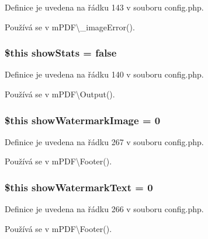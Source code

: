 Definice je uvedena na řádku 143 v souboru config.\-php.



Používá se v m\-P\-D\-F\textbackslash{}\-\_\-image\-Error().

\hypertarget{config_8php_ace8e8cc1120e006bd2107db6d57dc460}{
\subsubsection[{show\-Stats}]{\setlength{\rightskip}{0pt plus 5cm}\$this show\-Stats = {\bf false}}}\label{config_8php_ace8e8cc1120e006bd2107db6d57dc460}


Definice je uvedena na řádku 140 v souboru config.\-php.



Používá se v m\-P\-D\-F\textbackslash{}\-Output().

\hypertarget{config_8php_acf240bbb506618e1ed068b32d93d1a94}{
\subsubsection[{show\-Watermark\-Image}]{\setlength{\rightskip}{0pt plus 5cm}\$this show\-Watermark\-Image = 0}}\label{config_8php_acf240bbb506618e1ed068b32d93d1a94}


Definice je uvedena na řádku 267 v souboru config.\-php.



Používá se v m\-P\-D\-F\textbackslash{}\-Footer().

\hypertarget{config_8php_acd507265c6a9c2aac1f8e397f384c514}{
\subsubsection[{show\-Watermark\-Text}]{\setlength{\rightskip}{0pt plus 5cm}\$this show\-Watermark\-Text = 0}}\label{config_8php_acd507265c6a9c2aac1f8e397f384c514}


Definice je uvedena na řádku 266 v souboru config.\-php.



Používá se v m\-P\-D\-F\textbackslash{}\-Footer().

